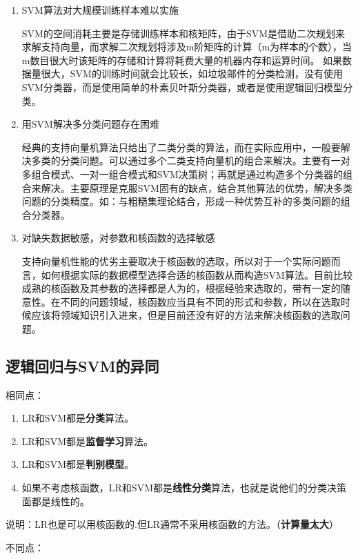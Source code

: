 \begin{enumerate}\itemsep0em
		\item SVM算法对大规模训练样本难以实施

			SVM的空间消耗主要是存储训练样本和核矩阵，由于SVM是借助二次规划来求解支持向量，而求解二次规划将涉及m阶矩阵的计算（m为样本的个数），当m数目很大时该矩阵的存储和计算将耗费大量的机器内存和运算时间。 如果数据量很大，SVM的训练时间就会比较长，如垃圾邮件的分类检测，没有使用SVM分类器，而是使用简单的朴素贝叶斯分类器，或者是使用逻辑回归模型分类。

		\item 用SVM解决多分类问题存在困难

			经典的支持向量机算法只给出了二类分类的算法，而在实际应用中，一般要解决多类的分类问题。可以通过多个二类支持向量机的组合来解决。主要有一对多组合模式、一对一组合模式和SVM决策树；再就是通过构造多个分类器的组合来解决。主要原理是克服SVM固有的缺点，结合其他算法的优势，解决多类问题的分类精度。如：与粗糙集理论结合，形成一种优势互补的多类问题的组合分类器。

		\item 对缺失数据敏感，对参数和核函数的选择敏感

			支持向量机性能的优劣主要取决于核函数的选取，所以对于一个实际问题而言，如何根据实际的数据模型选择合适的核函数从而构造SVM算法。目前比较成熟的核函数及其参数的选择都是人为的，根据经验来选取的，带有一定的随意性。在不同的问题领域，核函数应当具有不同的形式和参数，所以在选取时候应该将领域知识引入进来，但是目前还没有好的方法来解决核函数的选取问题。
\end{enumerate}


\subsection{逻辑回归与SVM的异同}

相同点：

\begin{enumerate}\itemsep0em
		\item LR和SVM都是{\bf 分类}算法。
		\item LR和SVM都是{\bf 监督学习}算法。
		\item LR和SVM都是{\bf 判别模型}。
		\item 如果不考虑核函数，LR和SVM都是{\bf 线性分类}算法，也就是说他们的分类决策面都是线性的。
\end{enumerate}

说明：LR也是可以用核函数的.但LR通常不采用核函数的方法。（{\bf 计算量太大}）


不同点：

